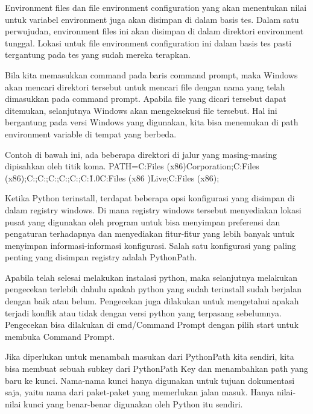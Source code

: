Environment files dan file environment configuration yang akan menentukan nilai untuk variabel environment juga akan disimpan di dalam basis tes. Dalam satu perwujudan, environment files ini akan disimpan di dalam direktori environment tunggal. Lokasi untuk file environment configuration ini dalam basis tes pasti tergantung pada tes yang sudah mereka terapkan. \cite{janniro1997method}

Bila kita memasukkan command pada baris command prompt, maka Windows akan mencari direktori tersebut untuk mencari file dengan nama yang telah dimasukkan pada command prompt. Apabila file yang dicari tersebut dapat ditemukan, selanjutnya Windows akan mengeksekusi file tersebut. Hal ini bergantung pada versi Windows yang digunakan, kita bisa menemukan di path environment variable di tempat yang berbeda. \cite{koster2002featflow}

Contoh di bawah ini, ada beberapa direktori di jalur yang masing-masing dipisahkan oleh titik koma.
PATH=C:\Program Files (x86)\NVIDIA Corporation\PhysX\Common;C:\Program Files (x86)\WinSCP;C:\Perl\site\bin;C:\Perl\bin;C:\WINDOWS{};C:\WINDOWS;C:\WINDOWS {}\Wbem;C:\WINDOWS{}\WindowsPowerShell\v1.0\;C:\Program Files (x86 )\Windows Live\Shared;C:\Program Files (x86)\FAHClient;

Ketika Python terinstall, terdapat beberapa opsi konfigurasi yang disimpan di dalam registry windows. Di mana registry windows tersebut menyediakan lokasi pusat yang digunakan oleh program untuk bisa menyimpan preferensi dan pengaturan terhadapnya dan menyediakan fitur-fitur yang lebih banyak untuk menyimpan informasi-informasi konfigurasi. Salah satu konfigurasi yang paling penting yang disimpan registry adalah PythonPath.\cite{hammond2000python}

Apabila telah selesai melakukan instalasi python, maka selanjutnya melakukan pengecekan terlebih dahulu apakah python yang sudah terinstall sudah berjalan dengan baik atau belum. Pengecekan juga dilakukan untuk mengetahui apakah terjadi konflik atau tidak dengan versi python yang terpasang sebelumnya. Pengecekan bisa dilakukan di cmd/Command Prompt dengan pilih start untuk membuka Command Prompt. \cite{mckinney2012python}

Jika diperlukan untuk menambah masukan dari PythonPath kita sendiri, kita bisa membuat sebuah subkey dari PythonPath Key dan menambahkan path yang baru ke kunci. Nama-nama kunci hanya digunakan untuk tujuan dokumentasi saja, yaitu nama dari paket-paket yang memerlukan jalan masuk. Hanya nilai-nilai kunci yang benar-benar digunakan oleh Python itu sendiri. \cite{hammond2000python}

